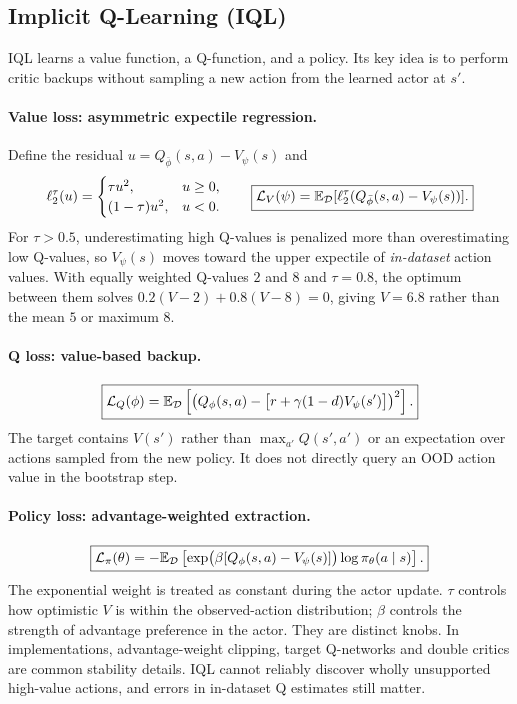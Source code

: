 \subsection{Implicit Q-Learning (IQL)}
IQL learns a value function, a Q-function, and a policy. Its key idea is to perform critic backups without sampling a new action from the learned actor at $s'$.

\paragraph{Value loss: asymmetric expectile regression.}
Define the residual $u=Q_{\bar\phi}(s,a)-V_\psi(s)$ and
\[
\ell_2^\tau(u)=
\begin{cases}
\tau u^2,&u\geq0,\\
(1-\tau)u^2,&u<0.
\end{cases}
\qquad
\boxed{\mathcal L_V(\psi)=\mathbb{E}_{\mathcal{D}}[\ell_2^\tau(Q_{\bar\phi}(s,a)-V_\psi(s))].}
\]
For $\tau>0.5$, underestimating high Q-values is penalized more than overestimating low Q-values, so $V_\psi(s)$ moves toward the upper expectile of \emph{in-dataset} action values. With equally weighted Q-values $2$ and $8$ and $\tau=0.8$, the optimum between them solves
$0.2(V-2)+0.8(V-8)=0$, giving $V=6.8$ rather than the mean $5$ or maximum $8$.

\paragraph{Q loss: value-based backup.}
\[
\boxed{\mathcal L_Q(\phi)=
\mathbb{E}_{\mathcal{D}}\left[
\left(Q_\phi(s,a)-
\bigl[r+\gamma(1-d)V_\psi(s')\bigr]\right)^2
\right].}
\]
The target contains $V(s')$ rather than $\max_{a'}Q(s',a')$ or an expectation over actions sampled from the new policy. It does not directly query an OOD action value in the bootstrap step.

\paragraph{Policy loss: advantage-weighted extraction.}
\[
\boxed{\mathcal L_\pi(\theta)=
-\mathbb{E}_{\mathcal{D}}\left[
\exp\bigl(\beta[Q_\phi(s,a)-V_\psi(s)]\bigr)
\log\pi_\theta(a\mid s)\right].}
\]
The exponential weight is treated as constant during the actor update. $\tau$ controls how optimistic $V$ is within the observed-action distribution; $\beta$ controls the strength of advantage preference in the actor. They are distinct knobs. In implementations, advantage-weight clipping, target Q-networks and double critics are common stability details. IQL cannot reliably discover wholly unsupported high-value actions, and errors in in-dataset Q estimates still matter.

